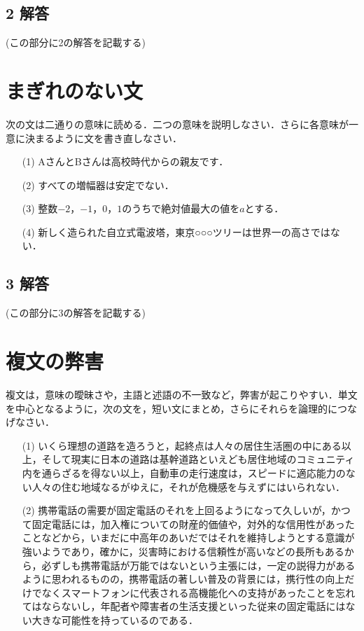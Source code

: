 \documentclass[11pt, a4paper]{jsarticle}
\begin{document}
\subsection*{2 解答}
(この部分に2の解答を記載する)

\newpage
\section{まぎれのない文}
次の文は二通りの意味に読める．二つの意味を説明しなさい．さらに各意味が一意に決まるように文を書き直しなさい．
\begin{itemize}
\item[(1)] AさんとBさんは高校時代からの親友です．
\item[(2)] すべての増幅器は安定でない．
\item[(3)] 整数$-2$，$-1$，$0$，$1$のうちで絶対値最大の値を$a$とする．
\item[(4)] 新しく造られた自立式電波塔，東京○○○ツリーは世界一の高さではない．
\end{itemize}
\subsection*{3 解答}
(この部分に3の解答を記載する)

\newpage
\section{複文の弊害}
複文は，意味の曖昧さや，主語と述語の不一致など，弊害が起こりやすい．単文を中心となるように，次の文を，短い文にまとめ，さらにそれらを論理的につなげなさい．
\begin{itemize}
    \item[(1)] いくら理想の道路を造ろうと，起終点は人々の居住生活圏の中にある以上，そして現実に日本の道路は基幹道路といえども居住地域のコミュニティ内を通らざるを得ない以上，自動車の走行速度は，スピードに適応能力のない人々の住む地域なるがゆえに，それが危機感を与えずにはいられない．

    \item[(2)] 携帯電話の需要が固定電話のそれを上回るようになって久しいが，かつて固定電話には，加入権についての財産的価値や，対外的な信用性があったことなどから，いまだに中高年のあいだではそれを維持しようとする意識が強いようであり，確かに，災害時における信頼性が高いなどの長所もあるから，必ずしも携帯電話が万能ではないという主張には，一定の説得力があるように思われるものの，携帯電話の著しい普及の背景には，携行性の向上だけでなくスマートフォンに代表される高機能化への支持があったことを忘れてはならないし，年配者や障害者の生活支援といった従来の固定電話にはない大きな可能性を持っているのである．
\end{itemize}
\end{document}

